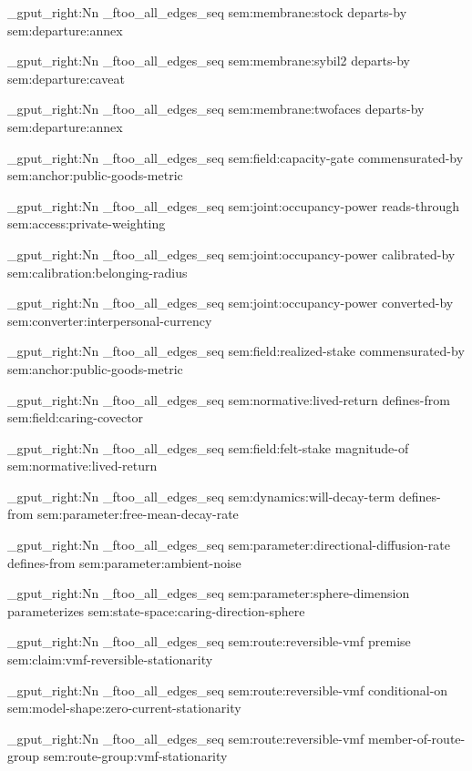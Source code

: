 \seq_gput_right:Nn \g_ftoo_all_edges_seq { { sem:membrane:stock } { departs-by } { sem:departure:annex } }

\seq_gput_right:Nn \g_ftoo_all_edges_seq { { sem:membrane:sybil2 } { departs-by } { sem:departure:caveat } }

\seq_gput_right:Nn \g_ftoo_all_edges_seq { { sem:membrane:twofaces } { departs-by } { sem:departure:annex } }

\seq_gput_right:Nn \g_ftoo_all_edges_seq { { sem:field:capacity-gate } { commensurated-by } { sem:anchor:public-goods-metric } }

\seq_gput_right:Nn \g_ftoo_all_edges_seq { { sem:joint:occupancy-power } { reads-through } { sem:access:private-weighting } }

\seq_gput_right:Nn \g_ftoo_all_edges_seq { { sem:joint:occupancy-power } { calibrated-by } { sem:calibration:belonging-radius } }

\seq_gput_right:Nn \g_ftoo_all_edges_seq { { sem:joint:occupancy-power } { converted-by } { sem:converter:interpersonal-currency } }

\seq_gput_right:Nn \g_ftoo_all_edges_seq { { sem:field:realized-stake } { commensurated-by } { sem:anchor:public-goods-metric } }

\seq_gput_right:Nn \g_ftoo_all_edges_seq { { sem:normative:lived-return } { defines-from } { sem:field:caring-covector } }

\seq_gput_right:Nn \g_ftoo_all_edges_seq { { sem:field:felt-stake } { magnitude-of } { sem:normative:lived-return } }

\seq_gput_right:Nn \g_ftoo_all_edges_seq { { sem:dynamics:will-decay-term } { defines-from } { sem:parameter:free-mean-decay-rate } }

\seq_gput_right:Nn \g_ftoo_all_edges_seq { { sem:parameter:directional-diffusion-rate } { defines-from } { sem:parameter:ambient-noise } }

\seq_gput_right:Nn \g_ftoo_all_edges_seq { { sem:parameter:sphere-dimension } { parameterizes } { sem:state-space:caring-direction-sphere } }

\seq_gput_right:Nn \g_ftoo_all_edges_seq { { sem:route:reversible-vmf } { premise } { sem:claim:vmf-reversible-stationarity } }

\seq_gput_right:Nn \g_ftoo_all_edges_seq { { sem:route:reversible-vmf } { conditional-on } { sem:model-shape:zero-current-stationarity } }

\seq_gput_right:Nn \g_ftoo_all_edges_seq { { sem:route:reversible-vmf } { member-of-route-group } { sem:route-group:vmf-stationarity } }

